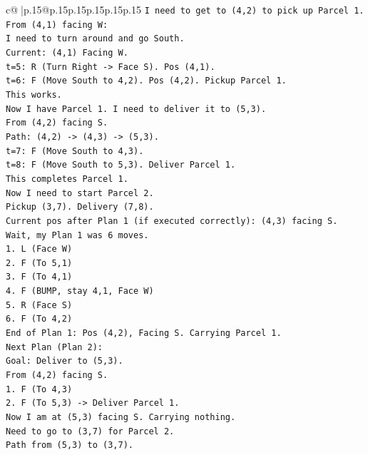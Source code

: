 \documentclass{article}
\begin{document}
{\begin{supertabular}{c@{$\;$}|p{.15\linewidth}@{}p{.15\linewidth}p{.15\linewidth}p{.15\linewidth}p{.15\linewidth}p{.15\linewidth}}
{{{\texttt{I need to get to (4,2) to pick up Parcel 1.} \\
\texttt{From (4,1) facing W:} \\
\texttt{I need to turn around and go South.} \\
\texttt{Current: (4,1) Facing W.} \\
\texttt{t=5: R (Turn Right {-}> Face S). Pos (4,1).} \\
\texttt{t=6: F (Move South to 4,2). Pos (4,2). Pickup Parcel 1.} \\
\texttt{This works.} \\
\texttt{Now I have Parcel 1. I need to deliver it to (5,3).} \\
\texttt{From (4,2) facing S.} \\
\texttt{Path: (4,2) {-}> (4,3) {-}> (5,3).} \\
\texttt{t=7: F (Move South to 4,3).} \\
\texttt{t=8: F (Move South to 5,3). Deliver Parcel 1.} \\
\texttt{This completes Parcel 1.} \\
\texttt{Now I need to start Parcel 2.} \\
\texttt{Pickup (3,7). Delivery (7,8).} \\
\texttt{Current pos after Plan 1 (if executed correctly): (4,3) facing S.} \\
\texttt{Wait, my Plan 1 was 6 moves.} \\
\texttt{1. L (Face W)} \\
\texttt{2. F (To 5,1)} \\
\texttt{3. F (To 4,1)} \\
\texttt{4. F (BUMP, stay 4,1, Face W)} \\
\texttt{5. R (Face S)} \\
\texttt{6. F (To 4,2)} \\
\texttt{End of Plan 1: Pos (4,2), Facing S. Carrying Parcel 1.} \\
\texttt{Next Plan (Plan 2):} \\
\texttt{Goal: Deliver to (5,3).} \\
\texttt{From (4,2) facing S.} \\
\texttt{1. F (To 4,3)} \\
\texttt{2. F (To 5,3) {-}> Deliver Parcel 1.} \\
\texttt{Now I am at (5,3) facing S. Carrying nothing.} \\
\texttt{Need to go to (3,7) for Parcel 2.} \\
\texttt{Path from (5,3) to (3,7).} \\
}}}
\end{supertabular}}
\end{document}
